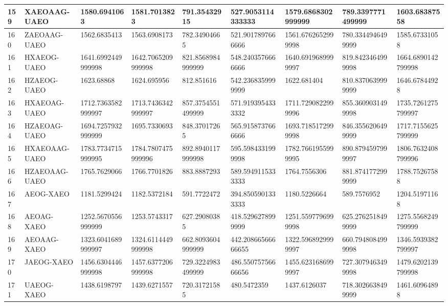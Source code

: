 {\begin{longtable}{|l|l|l|l|l|l|l|l|l|}
        159 & XAEOAAG-UAEO & 1580.6941063 & 1581.7013823 & 791.35432915 & 527.9053114333333 & 1579.6868302999999 & 789.3397771499999 & 1603.68387558 \\ \hline
        160 & ZAEOAAG-UAEO & 1562.6835413 & 1563.6908173 & 782.34904665 & 521.9017897666666 & 1561.6762652999998 & 780.3344946499999 & 1585.67331058 \\ \hline
        161 & HXAEOG-UAEO & 1641.6992449999998 & 1642.7065209999998 & 821.8568984999999 & 548.2403576666666 & 1640.6919689999997 & 819.8423464999998 & 1664.6890142799998 \\ \hline
        162 & HZAEOG-UAEO & 1623.68868 & 1624.695956 & 812.851616 & 542.2368359999999 & 1622.681404 & 810.8370639999999 & 1646.67844928 \\ \hline
        163 & HXAEOAG-UAEO & 1712.7363582999997 & 1713.7436342999997 & 857.3754551499999 & 571.9193954333332 & 1711.7290822999996 & 855.3609031499998 & 1735.7261275799997 \\ \hline
        164 & HZAEOAG-UAEO & 1694.7257932999999 & 1695.7330693 & 848.37017265 & 565.9158737666666 & 1693.7185172999998 & 846.3556206499999 & 1717.7155625799999 \\ \hline
        165 & HXAEOAAG-UAEO & 1783.7734715999995 & 1784.7807475999996 & 892.8940117999998 & 595.5984331999998 & 1782.7661955999995 & 890.8794597999997 & 1806.7632408799996 \\ \hline
        166 & HZAEOAAG-UAEO & 1765.7629066 & 1766.7701826 & 883.8887293 & 589.5949115333333 & 1764.7556306 & 881.8741772999999 & 1788.75267588 \\ \hline
        167 & AEOG-XAEO & 1181.5299424 & 1182.5372184 & 591.7722472 & 394.8505901333333 & 1180.5226664 & 589.7576952 & 1204.51971168 \\ \hline
        168 & AEOAG-XAEO & 1252.5670556999999 & 1253.5743317 & 627.29080385 & 418.5296278999999 & 1251.5597796999998 & 625.2762518499999 & 1275.5568249799999 \\ \hline
        169 & AEOAAG-XAEO & 1323.6041689999997 & 1324.6114449999998 & 662.8093604999999 & 442.20866566666655 & 1322.5968929999997 & 660.7948084999998 & 1346.5939382799997 \\ \hline
        170 & JAEOG-XAEO & 1456.6304446999998 & 1457.6377206999998 & 729.3224983499999 & 486.55075756666656 & 1455.6231686999997 & 727.3079463499998 & 1479.6202139799998 \\ \hline
        171 & UAEOG-XAEO & 1438.6198797 & 1439.6271557 & 720.31721585 & 480.5472359 & 1437.6126037 & 718.3026638499999 & 1461.60964898 \\ \hline

\end{longtable}}
